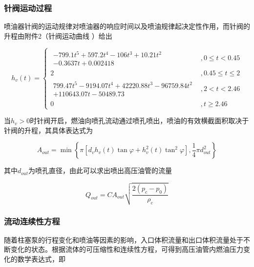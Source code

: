 \documentclass[withoutpreface,bwprint]{cumcmthesis} %
\begin{document}
			
			\subsubsection{针阀运动过程}
			
			喷油器针阀的运动规律对喷油器的响应时间以及喷油规律起决定性作用，而针阀的升程由附件2（针阀运动曲线 ）给出
			
			\begin{equation}
			h_v(t) = \left\{ \begin{array}{ll} \begin{array}{ll}
			-799.1 t^5 + 597.2 t^4 - 106 t^3 + 10.21 t^2 \\ -  0.3637 t + 0.002418 \end{array} &, 0 \leq t < 0.45 \\
			2 &, 0.45 \leq t \leq 2 \\
			\begin{array}{ll}
			799.47t^5 - 9194.07 t^4 + 42220.88 t^3 - 96759.84 t^2 \\ + 110643.07 t - 50489.73 
			\end{array} &, 2 < t < 2.46 \\
			0 &, t \geq 2.46
			\end{array} \right.
			\end{equation}
			
			当$h_v > 0$时针阀开启，燃油向喷孔流动通过喷孔喷出，喷油的有效横截面积取决于针阀的升程，其具体表达式为
			
			\begin{equation}A_{out} = \min\left\{ \pi[d_v h_v(t) \tan \varphi + h_v^2(t) \tan^2\varphi ], \frac{1}{4} \pi d_{out}^2 \right\}\end{equation}
			
			其中$d_{out}$为喷孔直径，由此可以求出喷出高压油管的流量
			
			\begin{equation}Q_{out} = CA_{out} \sqrt{\frac{2(p_c - p_0)}{\rho_c}}\end{equation}
			
			
			
			\subsubsection{流动连续性方程}
			
			随着柱塞泵的行程变化和喷油等因素的影响，入口体积流量和出口体积流量处于不断变化的状态。根据流体的可压缩性和连续性方程，可得到高压油管内燃油压力变化的数学表达式，即
			
\end{document}

